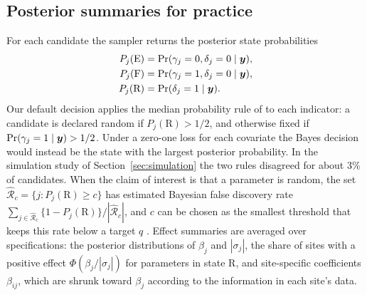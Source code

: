 \subsection{Posterior summaries for practice}\label{sec:summaries}

For each candidate the sampler returns the posterior state probabilities
\begin{equation}\label{eq:stateprob}
\begin{aligned}
P_j(\mathrm{E})&=\Pr(\gamma_j=0,\delta_j=0\mid\bm{y}),\\
P_j(\mathrm{F})&=\Pr(\gamma_j=1,\delta_j=0\mid\bm{y}),\\
P_j(\mathrm{R})&=\Pr(\delta_j=1\mid\bm{y}).
\end{aligned}
\end{equation}
Our default decision applies the median probability rule of \citet{barbieri2004optimal} to each indicator: a candidate is declared random if $P_j(\mathrm{R})>1/2$, and otherwise fixed if $\Pr(\gamma_j=1\mid\bm{y})>1/2$. Under a zero-one loss for each covariate the Bayes decision would instead be the state with the largest posterior probability. In the simulation study of Section~\ref{sec:simulation} the two rules disagreed for about 3\% of candidates. When the claim of interest is that a parameter is random, the set $\widehat{\mathcal R}_c=\{j:P_j(\mathrm{R})\ge c\}$ has estimated Bayesian false discovery rate $\sum_{j\in\widehat{\mathcal R}_c}\{1-P_j(\mathrm{R})\}/|\widehat{\mathcal R}_c|$, and $c$ can be chosen as the smallest threshold that keeps this rate below a target $q$ \citep{newton2004detecting}. Effect summaries are averaged over specifications: the posterior distributions of $\beta_j$ and $|\sigma_j|$, the share of sites with a positive effect $\Phi(\beta_j/|\sigma_j|)$ for parameters in state R, and site-specific coefficients $\beta_{ij}$, which are shrunk toward $\beta_j$ according to the information in each site's data.
